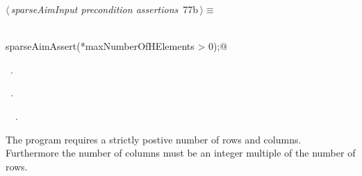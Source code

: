 \documentclass{article}
\begin{document}
\begin{flushleft} \small
\begin{minipage}{\linewidth}\label{scrap116}\raggedright\small
{} $\langle\,${\itshape sparseAimInput precondition assertions}\nobreak\ {\footnotesize {77b}}$\,\rangle\equiv$
\vspace{-1ex}
\begin{list}{}{} \item
\mbox{}\verb@@\\
\mbox{}\verb@      sparseAimAssert(*maxNumberOfHElements > 0);@\\
\mbox{}\verb@@{\NWsep}
\end{list}
\vspace{-1.5ex}
\footnotesize
\begin{list}{}{\setlength{\itemsep}{-\parsep}\setlength{\itemindent}{-\leftmargin}}
\item \NWtxtMacroDefBy\ .
\item \NWtxtMacroRefIn\ .
\item \NWtxtIdentsUsed\nobreak\  \verb@maxNumberOfHElements@\nobreak\ .
\item{}
\end{list}
\end{minipage}\vspace{4ex}
\end{flushleft}
The program requires a strictly postive number of rows and columns.
Furthermore the number of columns must be an integer
 multiple of the number of rows.
\end{document}
